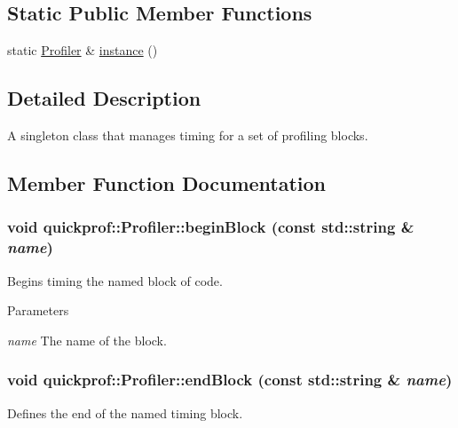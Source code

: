\subsection*{Static Public Member Functions}
\begin{DoxyCompactItemize}
\item 
static \hyperlink{classquickprof_1_1_profiler}{Profiler} \& \hyperlink{classquickprof_1_1_profiler_a9d221771f0638595966bda3585ebe3fa}{instance} ()
\end{DoxyCompactItemize}


\subsection{Detailed Description}
A singleton class that manages timing for a set of profiling blocks. 

\subsection{Member Function Documentation}
\hypertarget{classquickprof_1_1_profiler_a7606c62bd3c384bfdbce1ff9413693dd}{
\subsubsection[{beginBlock}]{\setlength{\rightskip}{0pt plus 5cm}void quickprof::Profiler::beginBlock (const std::string \& {\em name})}}
\label{classquickprof_1_1_profiler_a7606c62bd3c384bfdbce1ff9413693dd}
Begins timing the named block of code.


\begin{DoxyParams}{Parameters}
\item[{\em name}]The name of the block. \end{DoxyParams}
\hypertarget{classquickprof_1_1_profiler_ae122d033874481835099e7b7f9989642}{
\subsubsection[{endBlock}]{\setlength{\rightskip}{0pt plus 5cm}void quickprof::Profiler::endBlock (const std::string \& {\em name})}}
\label{classquickprof_1_1_profiler_ae122d033874481835099e7b7f9989642}
Defines the end of the named timing block.


